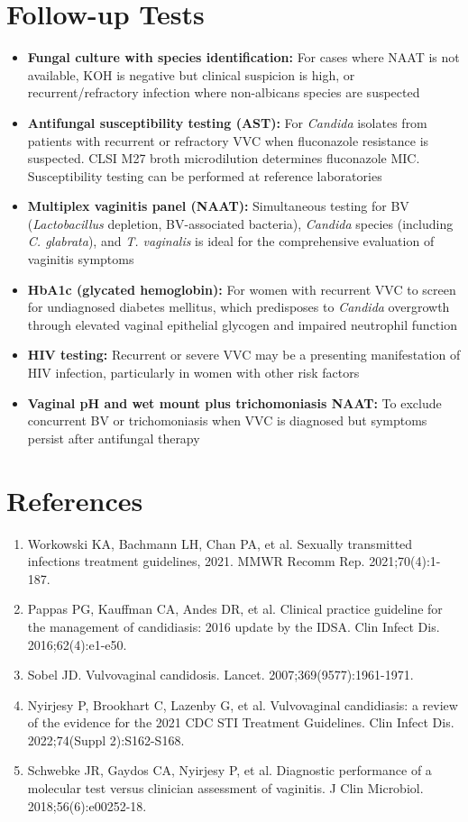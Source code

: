 \section*{Follow-up Tests}
\begin{itemize}
  \item \textbf{Fungal culture with species identification:} For cases where NAAT is not available, KOH is negative but clinical suspicion is high, or recurrent/refractory infection where non-albicans species are suspected
  \item \textbf{Antifungal susceptibility testing (AST):} For \textit{Candida} isolates from patients with recurrent or refractory VVC when fluconazole resistance is suspected. CLSI M27 broth microdilution determines fluconazole MIC. Susceptibility testing can be performed at reference laboratories
  \item \textbf{Multiplex vaginitis panel (NAAT):} Simultaneous testing for BV (\textit{Lactobacillus} depletion, BV-associated bacteria), \textit{Candida} species (including \textit{C. glabrata}), and \textit{T. vaginalis} is ideal for the comprehensive evaluation of vaginitis symptoms
  \item \textbf{HbA1c (glycated hemoglobin):} For women with recurrent VVC to screen for undiagnosed diabetes mellitus, which predisposes to \textit{Candida} overgrowth through elevated vaginal epithelial glycogen and impaired neutrophil function
  \item \textbf{HIV testing:} Recurrent or severe VVC may be a presenting manifestation of HIV infection, particularly in women with other risk factors
  \item \textbf{Vaginal pH and wet mount plus trichomoniasis NAAT:} To exclude concurrent BV or trichomoniasis when VVC is diagnosed but symptoms persist after antifungal therapy
\end{itemize}

\section*{References}
\begin{enumerate}
  \item Workowski KA, Bachmann LH, Chan PA, et al. Sexually transmitted infections treatment guidelines, 2021. MMWR Recomm Rep. 2021;70(4):1-187.
  \item Pappas PG, Kauffman CA, Andes DR, et al. Clinical practice guideline for the management of candidiasis: 2016 update by the IDSA. Clin Infect Dis. 2016;62(4):e1-e50.
  \item Sobel JD. Vulvovaginal candidosis. Lancet. 2007;369(9577):1961-1971.
  \item Nyirjesy P, Brookhart C, Lazenby G, et al. Vulvovaginal candidiasis: a review of the evidence for the 2021 CDC STI Treatment Guidelines. Clin Infect Dis. 2022;74(Suppl 2):S162-S168.
  \item Schwebke JR, Gaydos CA, Nyirjesy P, et al. Diagnostic performance of a molecular test versus clinician assessment of vaginitis. J Clin Microbiol. 2018;56(6):e00252-18.
\end{enumerate}

\clearpage
